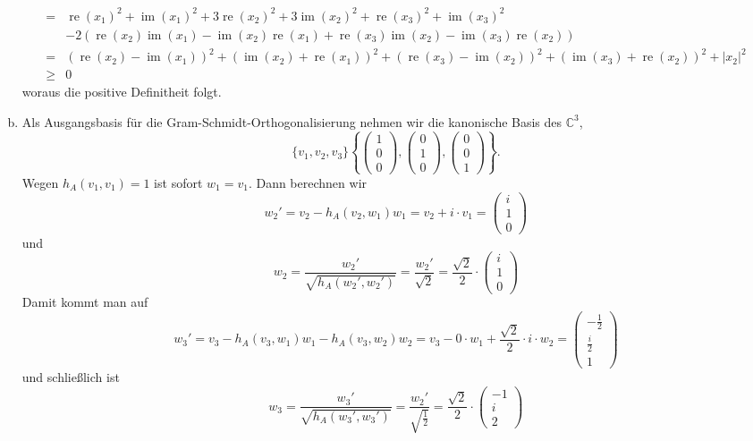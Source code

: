\documentclass{article}
\theoremstyle{definition}
\newcommand{\C}{\mathbb{C}}
\newcommand{\im}{\operatorname{im}}
\newcommand{\re}{\operatorname{re}}
\begin{document}
\begin{enumerate}[(a)]
\begin{align*}
		=& \re(x_1)^2 + \im(x_1)^2 + 3\re(x_2)^2 + 3\im(x_2)^2 + \re(x_3)^2 + \im(x_3)^2\\
		 &- 2(\re(x_2)\im(x_1) - \im(x_2)\re(x_1) + \re(x_3)\im(x_2) -\im(x_3)\re(x_2))\\
		=& (\re(x_2) - \im(x_1))^2 + (\im(x_2) + \re(x_1))^2 + (\re(x_3) - \im(x_2))^2 + (\im(x_3) + \re(x_2))^2 + |x_2|^2\\
		\geq&0
	\end{align*} woraus die positive Definitheit folgt.
	\item Als Ausgangsbasis für die Gram-Schmidt-Orthogonalisierung nehmen wir die kanonische Basis des $\C^3$, $$\{v_1, v_2, v_3\} \left\{\begin{pmatrix}
		1\\0\\0
	\end{pmatrix}, \begin{pmatrix}
		0\\1\\0
	\end{pmatrix}, \begin{pmatrix}
		0\\0\\1
	\end{pmatrix}\right\}.$$ Wegen $h_A(v_1, v_1) = 1$ ist sofort $w_1 = v_1$. Dann berechnen wir $$w_2' = v_2 - h_A(v_2, w_1)w_1 = v_2 + i\cdot v_1 = \begin{pmatrix}
		i\\
		1\\
		0
	\end{pmatrix}$$
	und $$w_2 = \frac{w_2'}{\sqrt{h_A(w_2', w_2')}} = \frac{w_2'}{\sqrt{2}} = \frac{\sqrt{2}}{2}\cdot \begin{pmatrix}
		i\\
		1\\
		0
	\end{pmatrix}$$
	Damit kommt man auf $$w_3' = v_3 - h_A(v_3, w_1)w_1 - h_A(v_3, w_2)w_2 = v_3 - 0\cdot w_1 + \frac{\sqrt{2}}{2}\cdot i \cdot w_2 = \begin{pmatrix}
		-\frac{1}{2}\\
		\frac{i}{2}\\
		1
	\end{pmatrix}$$
	und schließlich ist $$w_3 = \frac{w_3'}{\sqrt{h_A(w_3', w_3')}} = \frac{w_2'}{\sqrt{\frac{1}{2}}} = \frac{\sqrt{2}}{2}\cdot \begin{pmatrix}
		-1\\
		i\\
		2
	\end{pmatrix}$$

\end{enumerate}
\end{document}
